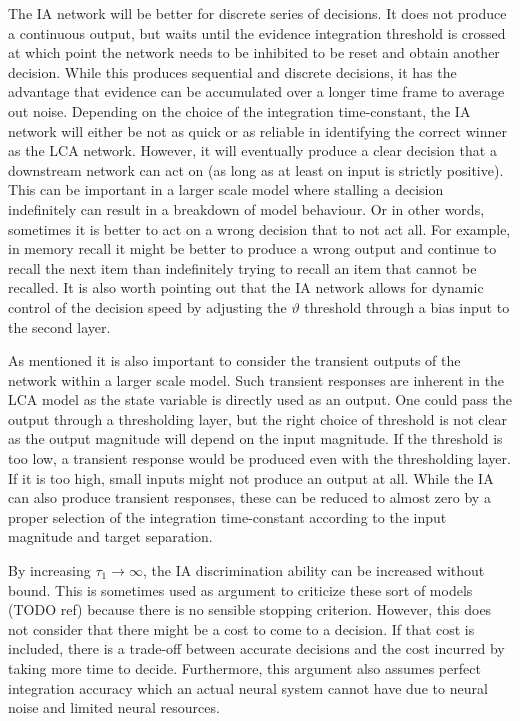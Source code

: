 The IA network will be better for discrete series of decisions.
It does not produce a continuous output, but waits until the evidence integration threshold is crossed at which point the network needs to be inhibited to be reset and obtain another decision.
While this produces sequential and discrete decisions, it has the advantage that evidence can be accumulated over a longer time frame to average out noise.
Depending on the choice of the integration time-constant, the IA network will either be not as quick or as reliable in identifying the correct winner as the LCA network.
However, it will eventually produce a clear decision that a downstream network can act on (as long as at least on input is strictly positive).
This can be important in a larger scale model where stalling a decision indefinitely can result in a breakdown of model behaviour.
Or in other words, sometimes it is better to act on a wrong decision that to not act all.
For example, in memory recall it might be better to produce a wrong output and continue to recall the next item than indefinitely trying to recall an item that cannot be recalled.
It is also worth pointing out that the IA network allows for dynamic control of the decision speed by adjusting the $\vartheta$ threshold through a bias input to the second layer.

As mentioned it is also important to consider the transient outputs of the network within a larger scale model.
Such transient responses are inherent in the LCA model as the state variable is directly used as an output.
One could pass the output through a thresholding layer, but the right choice of threshold is not clear as the output magnitude will depend on the input magnitude.
If the threshold is too low, a transient response would be produced even with the thresholding layer.
If it is too high, small inputs might not produce an output at all.
While the IA can also produce transient responses, these can be reduced to almost zero by a proper selection of the integration time-constant according to the input magnitude and target separation.

By increasing $\tau_1 \rightarrow \infty$, the IA discrimination ability can be increased without bound.
This is sometimes used as argument to criticize these sort of models (TODO ref) because there is no sensible stopping criterion.
However, this does not consider that there might be a cost to come to a decision.
If that cost is included, there is a trade-off between accurate decisions and the cost incurred by taking more time to decide.
Furthermore, this argument also assumes perfect integration accuracy which an actual neural system cannot have due to neural noise and limited neural resources.

